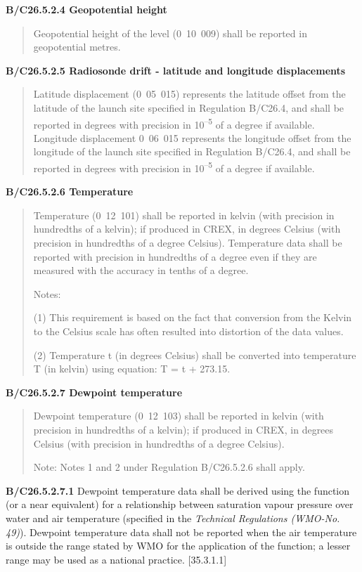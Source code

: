 \textbf{B/C26.5.2.4 Geopotential height}

\begin{quote}
Geopotential height of the level (0~10~009) shall be reported in geopotential metres.
\end{quote}

\textbf{B/C26.5.2.5 Radiosonde drift - latitude and longitude displacements}

\begin{quote}
Latitude displacement (0~05~015) represents the latitude offset from the latitude of the launch site specified in Regulation B/C26.4, and shall be reported in degrees with precision in 10\textsuperscript{--5} of a degree if available. Longitude displacement 0~06~015 represents the longitude offset from the longitude of the launch site specified in Regulation B/C26.4, and shall be reported in degrees with precision in 10\textsuperscript{--5} of a degree if available.
\end{quote}

\textbf{B/C26.5.2.6 Temperature}

\begin{quote}
Temperature (0~12~101) shall be reported in kelvin (with precision in hundredths of a kelvin); if produced in CREX, in degrees Celsius (with precision in hundredths of a degree Celsius). Temperature data shall be reported with precision in hundredths of a degree even if they are measured with the accuracy in tenths of a degree.

Notes:

(1) This requirement is based on the fact that conversion from the Kelvin to the Celsius scale has often resulted into distortion of the data values.

(2) Temperature t (in degrees Celsius) shall be converted into temperature T (in kelvin) using equation: T = t + 273.15.
\end{quote}

\textbf{B/C26.5.2.7 Dewpoint temperature}

\begin{quote}
Dewpoint temperature (0~12~103) shall be reported in kelvin (with precision in hundredths of a kelvin); if produced in CREX, in degrees Celsius (with precision in hundredths of a degree Celsius).

Note: Notes 1 and 2 under Regulation B/C26.5.2.6 shall apply.
\end{quote}

\textbf{B/C26.5.2.7.1} Dewpoint temperature data shall be derived using the function (or a near equivalent) for a relationship between saturation vapour pressure over water and air temperature (specified in the \emph{Technical Regulations (WMO-No. 49)}). Dewpoint temperature data shall not be reported when the air temperature is outside the range stated by WMO for the application of the function; a lesser range may be used as a national practice. {[}35.3.1.1{]}

